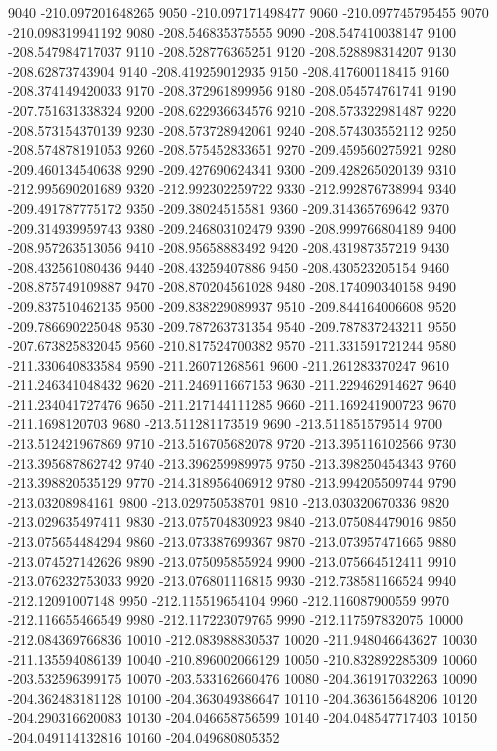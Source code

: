 {9040 -210.097201648265
9050 -210.097171498477
9060 -210.097745795455
9070 -210.098319941192
9080 -208.546835375555
9090 -208.547410038147
9100 -208.547984717037
9110 -208.528776365251
9120 -208.528898314207
9130 -208.62873743904
9140 -208.419259012935
9150 -208.417600118415
9160 -208.374149420033
9170 -208.372961899956
9180 -208.054574761741
9190 -207.751631338324
9200 -208.622936634576
9210 -208.573322981487
9220 -208.573154370139
9230 -208.573728942061
9240 -208.574303552112
9250 -208.574878191053
9260 -208.575452833651
9270 -209.459560275921
9280 -209.460134540638
9290 -209.427690624341
9300 -209.428265020139
9310 -212.995690201689
9320 -212.992302259722
9330 -212.992876738994
9340 -209.491787775172
9350 -209.38024515581
9360 -209.314365769642
9370 -209.314939959743
9380 -209.246803102479
9390 -208.999766804189
9400 -208.957263513056
9410 -208.95658883492
9420 -208.431987357219
9430 -208.432561080436
9440 -208.43259407886
9450 -208.430523205154
9460 -208.875749109887
9470 -208.870204561028
9480 -208.174090340158
9490 -209.837510462135
9500 -209.838229089937
9510 -209.844164006608
9520 -209.786690225048
9530 -209.787263731354
9540 -209.787837243211
9550 -207.673825832045
9560 -210.817524700382
9570 -211.331591721244
9580 -211.330640833584
9590 -211.26071268561
9600 -211.261283370247
9610 -211.246341048432
9620 -211.246911667153
9630 -211.229462914627
9640 -211.234041727476
9650 -211.217144111285
9660 -211.169241900723
9670 -211.1698120703
9680 -213.511281173519
9690 -213.511851579514
9700 -213.512421967869
9710 -213.516705682078
9720 -213.395116102566
9730 -213.395687862742
9740 -213.396259989975
9750 -213.398250454343
9760 -213.398820535129
9770 -214.318956406912
9780 -213.994205509744
9790 -213.03208984161
9800 -213.029750538701
9810 -213.030320670336
9820 -213.029635497411
9830 -213.075704830923
9840 -213.075084479016
9850 -213.075654484294
9860 -213.073387699367
9870 -213.073957471665
9880 -213.074527142626
9890 -213.075095855924
9900 -213.075664512411
9910 -213.076232753033
9920 -213.076801116815
9930 -212.738581166524
9940 -212.12091007148
9950 -212.115519654104
9960 -212.116087900559
9970 -212.116655466549
9980 -212.117223079765
9990 -212.117597832075
10000 -212.084369766836
10010 -212.083988830537
10020 -211.948046643627
10030 -211.135594086139
10040 -210.896002066129
10050 -210.832892285309
10060 -203.532596399175
10070 -203.533162660476
10080 -204.361917032263
10090 -204.362483181128
10100 -204.363049386647
10110 -204.363615648206
10120 -204.290316620083
10130 -204.046658756599
10140 -204.048547717403
10150 -204.049114132816
10160 -204.049680805352
}

